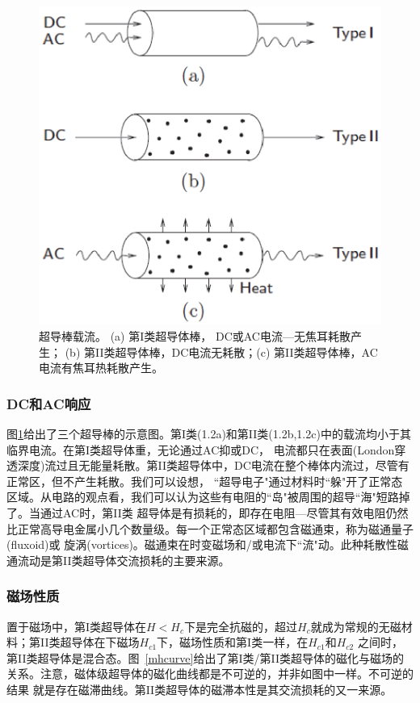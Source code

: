 \begin{figure}[htbp]
	\centering
	\includegraphics[scale=0.6]{chpt1/figs/fig1.2.eps}
	\caption{
		超导棒载流。 (a) 第I类超导体棒， DC或AC电流---无焦耳耗散产生；
		(b) 第II类超导体棒，DC电流无耗散；(c) 第II类超导体棒，AC电流有焦耳热耗散产生。}\label{acdccurrent}
\end{figure}

\subsubsection{DC和AC响应}
图\ref{acdccurrent}给出了三个超导棒的示意图。第I类(1.2a)和第II类(1.2b,1.2c)中的载流均小于其临界电流。在第I类超导体重，无论通过AC抑或DC，
电流都只在表面(London穿透深度)流过且无能量耗散。第II类超导体中，DC电流在整个棒体内流过，尽管有正常区，但不产生耗散。我们可以设想，
``超导电子"通过材料时``躲"开了正常态区域。从电路的观点看，我们可以认为这些有电阻的``岛"被周围的超导``海"短路掉了。当通过AC时，第II类
超导体是有损耗的，即存在电阻---尽管其有效电阻仍然比正常高导电金属小几个数量级。每一个正常态区域都包含磁通束，称为磁通量子(fluxoid)或
旋涡(vortices)。磁通束在时变磁场和/或电流下``流"动。此种耗散性磁通流动是第II类超导体交流损耗的主要来源。

\subsubsection{磁场性质}
置于磁场中，第I类超导体在$H<H_c$下是完全抗磁的，超过$H_c$就成为常规的无磁材料；第II类超导体在下磁场$H_{c1}$下，磁场性质和第I类一样，在$H_{c1}$和$H_{c2}$
之间时，第II类超导体是混合态。图~\ref{mhcurve}给出了第I类/第II类超导体的磁化与磁场的关系。注意，磁体级超导体的磁化曲线都是不可逆的，并非如图中一样。不可逆的结果
就是存在磁滞曲线。第II类超导体的磁滞本性是其交流损耗的又一来源。

